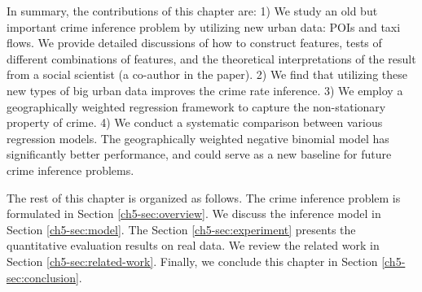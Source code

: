 In summary, the contributions of this chapter are:  1) We study an old but important crime inference problem by utilizing new urban data: POIs and taxi flows. We provide detailed discussions of how to construct features, tests of different combinations of features, and the theoretical interpretations of the result from a social scientist (a co-author in the paper). 2) We find that utilizing these new types of big urban data improves the crime rate inference. 3) We employ a geographically weighted regression framework to capture the non-stationary property of crime. 4) We conduct a systematic comparison between various regression models. The geographically weighted negative binomial model has significantly better performance, and could serve as a new baseline for future crime inference problems.

The rest of this chapter is organized as follows. The crime inference problem is formulated in Section \ref{ch5-sec:overview}. We discuss the inference model in Section \ref{ch5-sec:model}. The Section \ref{ch5-sec:experiment} presents the quantitative evaluation results on real data. We review the related work in Section \ref{ch5-sec:related-work}.  Finally, we conclude this chapter in Section \ref{ch5-sec:conclusion}.

